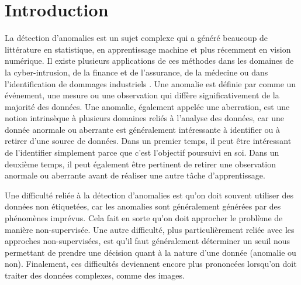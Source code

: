 \chapter*{Introduction}         %
\label{chap:introduction}       %


La détection d'anomalies est un sujet complexe qui a généré beaucoup de littérature en statistique,  en apprentissage machine et plus récemment en vision numérique. Il existe plusieurs applications de ces méthodes dans les domaines de la cyber-intrusion, de la finance et de l'assurance, de la médecine ou dans l'identification de dommages industriels \citep{chandola2009anomaly}. Une anomalie est définie par \cite{Zimek2017} comme un événement, une mesure ou une observation qui diffère significativement de la majorité des données. Une anomalie, également appelée une aberration, est une notion intrinsèque à plusieurs domaines reliés à l'analyse des données, car une donnée anormale ou aberrante est généralement intéressante à identifier ou à retirer d'une source de données. Dans un premier temps, il peut être intéressant de l'identifier simplement parce que c'est  l'objectif poursuivi en soi. Dans un deuxième temps, il peut également être pertinent de retirer une observation anormale ou aberrante avant de réaliser une autre tâche d'apprentissage. 

Une difficulté reliée à la détection d'anomalies est qu'on doit souvent utiliser des données non étiquetées, car les anomalies sont généralement générées par des phénomènes imprévus. Cela fait en sorte qu'on doit approcher le problème de manière non-supervisée. Une autre difficulté, plus particulièrement reliée avec les approches non-supervisées, est qu'il faut généralement déterminer un seuil nous permettant de prendre une décision quant à la nature d'une donnée (anomalie ou non). Finalement, ces difficultés deviennent encore plus prononcées lorsqu'on doit traiter des données complexes, comme des images.


